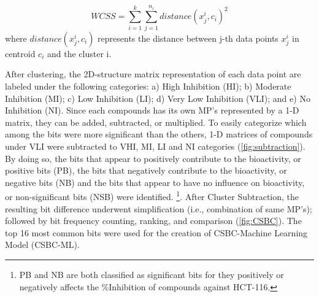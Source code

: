 \begin{equation}
   WCSS =\sum_{i=1}^{k}\sum_{j=1}^{n_{i}}distance(x^{i}_{j},c_{i})^{2}
   \label{eq:WCSS}
\end{equation}    
where $distance(x^{i}_{j},c_{i})$ represents the distance between j-th data points $x^{i}_{j}$ in centroid $c_{i}$ and the cluster i. 

After clustering, the 2D-structure matrix representation of each data point are labeled under the following categories: a) High Inhibition (HI); b) Moderate Inhibition (MI); c) Low Inhibition (LI); d) Very Low Inhibition (VLI); and e) No Inhibition (NI). Since each compounds has its own MP's represented by a 1-D matrix, they can be added, subtracted, or multiplied. To easily categorize which among the bits were more significant than the others, 1-D matrices of compounds under VLI were subtracted to VHI, MI, LI and NI categories (\autoref{fig:subtraction}). By doing so, the bits that appear to positively contribute to the bioactivity, or positive bits (PB), the bits that negatively contribute to the bioactivity, or negative bits (NB) and the bits that appear to have no influence on bioactivity, or non-significant bits (NSB) were identified. \footnote{PB and NB are both classified as significant bits for they positively or negatively affects the \%Inhibition of compounds against HCT-116.}. After Cluster Subtraction, the resulting bit difference underwent simplification (i.e., combination of same MP's); followed by bit frequency counting, ranking, and comparison (\autoref{fig:CSBC}). The top 16 most common bits were used for the creation of CSBC-Machine Learning Model (CSBC-ML).

